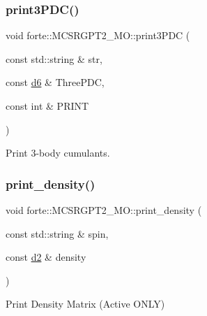 \subsubsection{\texorpdfstring{print3\+P\+D\+C()}{print3PDC()}}
{\footnotesize\ttfamily void forte\+::\+M\+C\+S\+R\+G\+P\+T2\+\_\+\+M\+O\+::print3\+P\+DC (\begin{DoxyParamCaption}\item[{const std\+::string \&}]{str,  }\item[{const \mbox{\hyperlink{mcsrgpt2__mo_8h_aba90f18433f93c10946dc45fc444d743}{d6}} \&}]{Three\+P\+DC,  }\item[{const int \&}]{P\+R\+I\+NT }\end{DoxyParamCaption})\hspace{0.3cm}{\ttfamily [protected]}}



Print 3-\/body cumulants. 

\mbox{\label{classforte_1_1_m_c_s_r_g_p_t2___m_o_a2d4dc40b11c8cfb77171700a504602bc}} 
\subsubsection{\texorpdfstring{print\+\_\+density()}{print\_density()}}
{\footnotesize\ttfamily void forte\+::\+M\+C\+S\+R\+G\+P\+T2\+\_\+\+M\+O\+::print\+\_\+density (\begin{DoxyParamCaption}\item[{const std\+::string \&}]{spin,  }\item[{const \mbox{\hyperlink{mcsrgpt2__mo_8h_ae5de8a172a3b363a852d6d32e6d90537}{d2}} \&}]{density }\end{DoxyParamCaption})\hspace{0.3cm}{\ttfamily [protected]}}



Print Density Matrix (Active O\+N\+LY) 

\mbox{\label{classforte_1_1_m_c_s_r_g_p_t2___m_o_a3090cb11611f7d3bd74dcb59ee431ffb}} 
